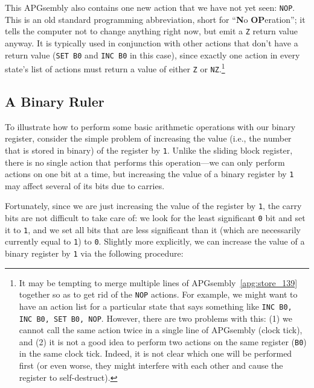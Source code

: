 This APGsembly also contains one new action that we have not yet seen: \texttt{NOP}. This is an old standard programming abbreviation, short for ``\textbf{N}o \textbf{OP}eration''; it tells the computer not to change anything right now, but emit a \texttt{Z} return value anyway. It is typically used in conjunction with other actions that don't have a return value (\texttt{SET B0} and \texttt{INC B0} in this case), since exactly one action in every state's list of actions must return a value of either \texttt{Z} or \texttt{NZ}.\footnote{It may be tempting to merge multiple lines of APGsembly~\ref{apg:store_139} together so as to get rid of the \texttt{NOP} actions. For example, we might want to have an action list for a particular state that says something like \texttt{INC B0, INC B0, SET B0, NOP}. However, there are two problems with this: (1) we cannot call the same action twice in a single line of APGsembly (clock tick), and (2) it is not a good idea to perform two actions on the same register (\texttt{B0}) in the same clock tick. Indeed, it is not clear which one will be performed first (or even worse, they might interfere with each other and cause the register to self-destruct).}


\subsection{A Binary Ruler}\label{sec:binary_ruler}

To illustrate how to perform some basic arithmetic operations with our binary register, consider the simple problem of increasing the value (i.e., the number that is stored in binary) of the register by \texttt{1}. Unlike the sliding block register, there is no single action that performs this operation---we can only perform actions on one bit at a time, but increasing the value of a binary register by \texttt{1} may affect several of its bits due to carries.

Fortunately, since we are just increasing the value of the register by \texttt{1}, the carry bits are not difficult to take care of: we look for the least significant \texttt{0} bit and set it to \texttt{1}, and we set all bits that are less significant than it (which are necessarily currently equal to \texttt{1}) to \texttt{0}. Slightly more explicitly, we can increase the value of a binary register by \texttt{1} via the following procedure:\smallskip

